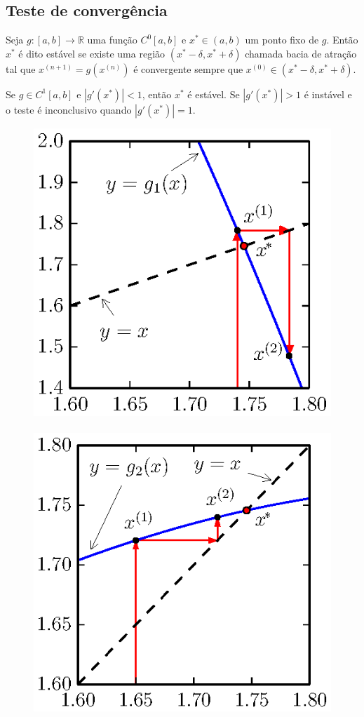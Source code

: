 \subsection{Teste de convergência}
Seja $g:[a,b]\to\mathbb{R}$ uma função $C^0[a,b]$ e $x^*\in(a,b)$ um ponto fixo de $g$. Então $x^*$ é dito estável se existe uma região $(x^*-\delta,x^*+\delta)$ chamada bacia de atração tal que $x^{(n+1)}=g(x^{(n)})$ é convergente sempre que $x^{(0)}\in(x^*-\delta,x^*+\delta)$.

\begin{prop}
 Se $g\in C^1[a,b]$ e  $|g'(x^*)|<1$, então $x^*$ é estável. Se $|g'(x^*)|>1$ é instável e o teste é inconclusivo quando $|g'(x^*)|=1$.
\end{prop}

\begin{figure}[h]
    \centering
        \includegraphics{./cap_equacao1d/pics/ponto_fixo_instavel/ponto_fixo_instavel.eps}
~
        \includegraphics{./cap_equacao1d/pics/ponto_fixo_estavel/ponto_fixo_estavel.eps}

\end{figure}

